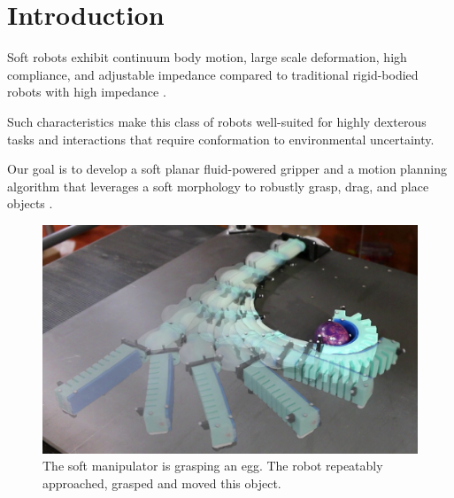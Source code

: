 \section{Introduction}

Soft robots exhibit continuum body motion, large scale deformation, high compliance, and adjustable impedance  compared to traditional rigid-bodied robots with high impedance \cite{trivedi2008soft}. 

Such characteristics make this class of robots well-suited for highly dexterous tasks and interactions that require conformation to environmental uncertainty.

Our goal is to develop a soft planar fluid-powered gripper and a motion planning algorithm that leverages a soft morphology to robustly grasp, drag, and place objects . 

\begin{figure}[htb]
\centering
   \includegraphics[width=0.99\columnwidth]{Figures/experimental_results/egg_approach/egg_approach_sequence_brighter}
   \caption{The soft manipulator is grasping an egg. The robot repeatably approached, grasped and moved this object.}
   \label{fig:egg_approach_sequence}
\end{figure}


